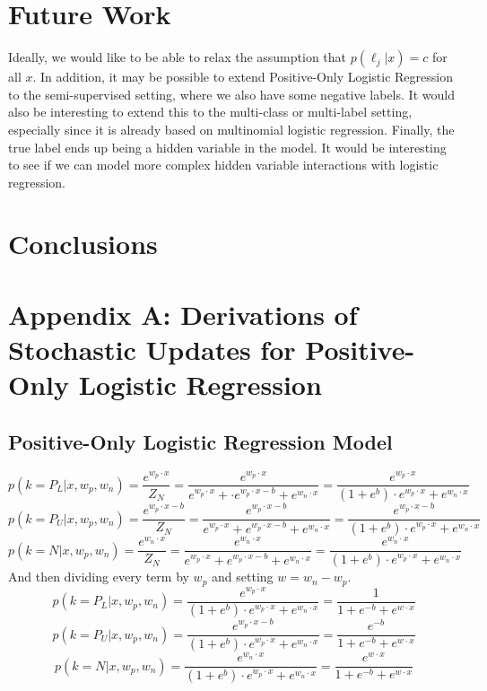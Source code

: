 \documentclass{article}
\begin{document}
\section{Future Work}

Ideally, we would like to be able to relax the assumption that $p(\ell_j|x)=c$ for all $x$.  In addition, it may be possible to extend Positive-Only Logistic Regression to the semi-supervised setting, where we also have some negative labels.  It would also be interesting to extend this to the multi-class or multi-label setting, especially since it is already based on multinomial logistic regression.  Finally, the true label ends up being a hidden variable in the model. It would be interesting to see if we can model more complex hidden variable interactions with logistic regression.

\section{Conclusions}




\onecolumn

\section{Appendix A: Derivations of Stochastic Updates for Positive-Only Logistic Regression}

\subsection{Positive-Only Logistic Regression Model}
$$
p(k=P_L | x, w_p, w_n) =  \frac{e^{w_p \cdot x}}{Z_N} = \frac{e^{w_p \cdot x}}{e^{w_p \cdot x} + \cdot e^{w_p \cdot x - b} + e^{w_n \cdot x}} = \frac{e^{w_p \cdot x}}{(1 + e^{b}) \cdot e^{w_p \cdot x} + e^{w_n \cdot x}}
$$
$$
p(k=P_U | x, w_p, w_n) =  \frac{e^{w_p \cdot x - b}}{Z_N} = \frac{e^{w_p \cdot x - b}}{e^{w_p \cdot x} + e^{w_p \cdot x - b} + e^{w_n \cdot x}} = \frac{e^{w_p \cdot x - b}}{(1 + e^{b}) \cdot e^{w_p \cdot x} + e^{w_n \cdot x}}
$$
$$
p(k=N | x, w_p, w_n) =  \frac{e^{w_n \cdot x}}{Z_N} = \frac{e^{w_n \cdot x}}{e^{w_p \cdot x} + e^{w_p \cdot x - b} + e^{w_n \cdot x}} = \frac{e^{w_n \cdot x}}{(1 + e^{b}) \cdot e^{w_p \cdot x} + e^{w_n \cdot x}}
$$
And then dividing every term by $w_p$ and setting $w = w_n - w_p$.
$$
p(k=P_L | x, w_p, w_n) = \frac{e^{w_p \cdot x}}{(1 + e^{b}) \cdot e^{w_p \cdot x} + e^{w_n \cdot x}} = \frac{1}{1 + e^{-b} + e^{w \cdot x}}
$$
$$
p(k=P_U | x, w_p, w_n) = \frac{e^{w_p \cdot x - b}}{(1 + e^{b}) \cdot e^{w_p \cdot x} + e^{w_n \cdot x}} = \frac{e^{-b}}{1 + e^{-b} + e^{w \cdot x}}
$$
$$
p(k=N | x, w_p, w_n) = \frac{e^{w_n \cdot x}}{(1 + e^{b}) \cdot e^{w_p \cdot x} + e^{w_n \cdot x}} = \frac{e^{w \cdot x}}{1 + e^{-b} + e^{w \cdot x}}
$$
\end{document}
